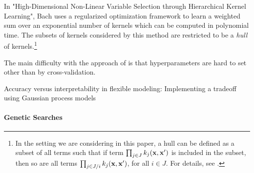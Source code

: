 \documentclass[twoside]{article}
\begin{document}
In "High-Dimensional Non-Linear Variable Selection through Hierarchical Kernel Learning", Bach\cite{DBLP:journals/corr/abs-0909-0844} uses a regularized optimization framework to learn a weighted sum over an exponential number of kernels which can be computed in polynomial time.
The subsets of kernels considered by this method are restricted to be a \textit{hull} of kernels.\footnote{In the setting we are considering in this paper, a hull can be defined as a subset of all terms such that if term $\prod_{j \in J} k_j(\bf x, x')$ is included in the subset, then so are all terms $\prod_{j \in J / i} k_j(\bf x, x')$, for all $i \in J$.
For details, see \cite{DBLP:journals/corr/abs-0909-0844}.}

The main difficulty with the approach of \cite{DBLP:journals/corr/abs-0909-0844} is that hyperparameters are hard to set other than by cross-validation. 

Accuracy versus interpretability in flexible modeling: Implementing a tradeoff using Gaussian process models \cite{plate1999accuracy}


\paragraph{Genetic Searches}
\end{document}
